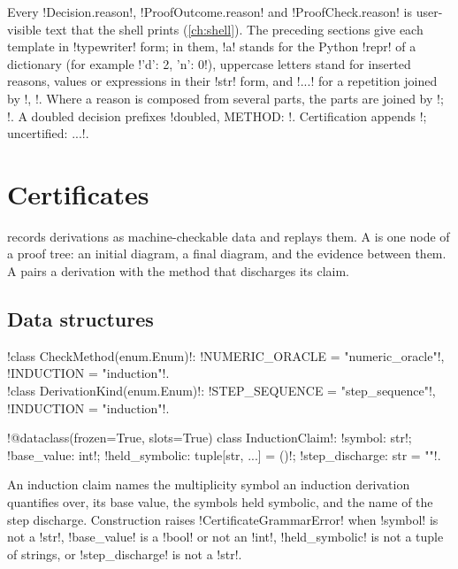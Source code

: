 Every \py!Decision.reason!, \py!ProofOutcome.reason! and \py!ProofCheck.reason! is user-visible text that the shell prints (\cref{ch:shell}). The preceding sections give each template in \code!typewriter! form; in them, \code!{a}! stands for the Python \py!repr! of a dictionary (for example \code!{'d': 2, 'n': 0}!), uppercase letters stand for inserted reasons, values or expressions in their \py!str! form, and \code!...! for a repetition joined by \code!, !. Where a reason is composed from several parts, the parts are joined by \code!; !. A doubled decision prefixes \code!doubled, METHOD: !. Certification appends \code!; uncertified: ...!.

\section{Certificates}\label{sec:proofs-certificates}

 records derivations as machine-checkable data and replays them. A  is one node of a proof tree: an initial diagram, a final diagram, and the evidence between them. A  pairs a derivation with the method that discharges its claim.

\subsection{Data structures}

\begin{signature}
\py!class CheckMethod(enum.Enum)!: \py!NUMERIC_ORACLE = "numeric_oracle"!, \py!INDUCTION = "induction"!.\\
\py!class DerivationKind(enum.Enum)!: \py!STEP_SEQUENCE = "step_sequence"!, \py!INDUCTION = "induction"!.
\end{signature}

\begin{signature}
\py!@dataclass(frozen=True, slots=True) class InductionClaim!: \py!symbol: str!; \py!base_value: int!; \py!held_symbolic: tuple[str, ...] = ()!; \py!step_discharge: str = ""!.
\end{signature}
An induction claim names the multiplicity symbol an induction derivation quantifies over, its base value, the symbols held symbolic, and the name of the step discharge. Construction raises \py!CertificateGrammarError! when \py!symbol! is not a \py!str!, \py!base_value! is a \py!bool! or not an \py!int!, \py!held_symbolic! is not a tuple of strings, or \py!step_discharge! is not a \py!str!.

